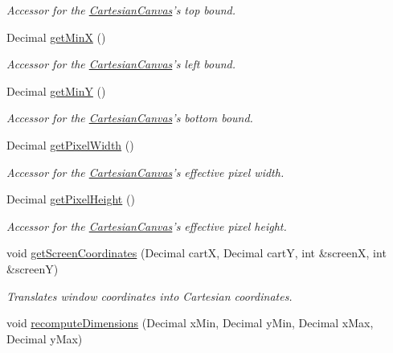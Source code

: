 \begin{DoxyCompactItemize}
\begin{DoxyCompactList}\small\item\em Accessor for the \hyperlink{classtsgl_1_1_cartesian_canvas}{Cartesian\-Canvas}'s top bound. \end{DoxyCompactList}\item 
Decimal \hyperlink{classtsgl_1_1_cartesian_canvas_a4ab031c60f6fed675e8163c30c01e5d6}{get\-Min\-X} ()
\begin{DoxyCompactList}\small\item\em Accessor for the \hyperlink{classtsgl_1_1_cartesian_canvas}{Cartesian\-Canvas}'s left bound. \end{DoxyCompactList}\item 
Decimal \hyperlink{classtsgl_1_1_cartesian_canvas_a99c935c99c9a29f2cc918963d734d9a6}{get\-Min\-Y} ()
\begin{DoxyCompactList}\small\item\em Accessor for the \hyperlink{classtsgl_1_1_cartesian_canvas}{Cartesian\-Canvas}'s bottom bound. \end{DoxyCompactList}\item 
Decimal \hyperlink{classtsgl_1_1_cartesian_canvas_ac9bb990b8c34a1575bcb861e4b819372}{get\-Pixel\-Width} ()
\begin{DoxyCompactList}\small\item\em Accessor for the \hyperlink{classtsgl_1_1_cartesian_canvas}{Cartesian\-Canvas}'s effective pixel width. \end{DoxyCompactList}\item 
Decimal \hyperlink{classtsgl_1_1_cartesian_canvas_a699c2b41b3b46bfac8649fb38b24c901}{get\-Pixel\-Height} ()
\begin{DoxyCompactList}\small\item\em Accessor for the \hyperlink{classtsgl_1_1_cartesian_canvas}{Cartesian\-Canvas}'s effective pixel height. \end{DoxyCompactList}\item 
void \hyperlink{classtsgl_1_1_cartesian_canvas_a8fea34cfcee9bc577c1e1ab6d28a8185}{get\-Screen\-Coordinates} (Decimal cart\-X, Decimal cart\-Y, int \&screen\-X, int \&screen\-Y)
\begin{DoxyCompactList}\small\item\em Translates window coordinates into Cartesian coordinates. \end{DoxyCompactList}\item 
void \hyperlink{classtsgl_1_1_cartesian_canvas_ac833a44fe7367f6411292707de37beef}{recompute\-Dimensions} (Decimal x\-Min, Decimal y\-Min, Decimal x\-Max, Decimal y\-Max)

\end{DoxyCompactItemize}
